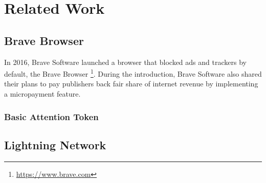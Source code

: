 \chapter{Related Work}
\label{cha:relatedwork}



\section{Brave Browser}
In 2016, Brave Software launched a browser that blocked ads and trackers by default, the Brave Browser \footnote{\url{https://www.brave.com}}. During the introduction, Brave Software also shared their plans to pay publishers back fair share of internet revenue by implementing a micropayment feature.

\subsection{Basic Attention Token} 

\section{Lightning Network}

